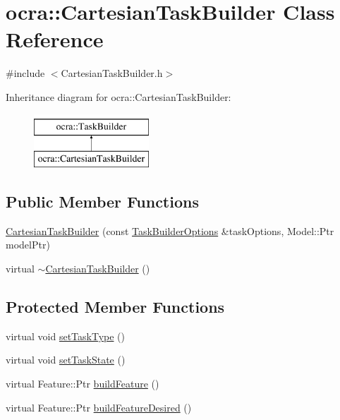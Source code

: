\hypertarget{classocra_1_1CartesianTaskBuilder}{}\section{ocra\+:\+:Cartesian\+Task\+Builder Class Reference}
\label{classocra_1_1CartesianTaskBuilder}


{\ttfamily \#include $<$Cartesian\+Task\+Builder.\+h$>$}

Inheritance diagram for ocra\+:\+:Cartesian\+Task\+Builder\+:\begin{figure}[H]
\begin{center}
\leavevmode
\includegraphics[height=2.000000cm]{d5/d81/classocra_1_1CartesianTaskBuilder}
\end{center}
\end{figure}
\subsection*{Public Member Functions}
\begin{DoxyCompactItemize}
\item 
\hyperlink{classocra_1_1CartesianTaskBuilder_ad78453b86c3777783c94098967426bad}{Cartesian\+Task\+Builder} (const \hyperlink{classocra_1_1TaskBuilderOptions}{Task\+Builder\+Options} \&task\+Options, Model\+::\+Ptr model\+Ptr)
\item 
virtual \hyperlink{classocra_1_1CartesianTaskBuilder_aecc30a79dfbeaf935d302a3f1e2c3fac}{$\sim$\+Cartesian\+Task\+Builder} ()
\end{DoxyCompactItemize}
\subsection*{Protected Member Functions}
\begin{DoxyCompactItemize}
\item 
virtual void \hyperlink{classocra_1_1CartesianTaskBuilder_a679842b95d6f7296a466636fd21bbbb8}{set\+Task\+Type} ()
\item 
virtual void \hyperlink{classocra_1_1CartesianTaskBuilder_a9e3175e5792c5ed9a7e3febbe458d21c}{set\+Task\+State} ()
\item 
virtual Feature\+::\+Ptr \hyperlink{classocra_1_1CartesianTaskBuilder_a58c8e4a299db03180c058eefcd711052}{build\+Feature} ()
\item 
virtual Feature\+::\+Ptr \hyperlink{classocra_1_1CartesianTaskBuilder_a308b204435c4063991d8101c0a8c512c}{build\+Feature\+Desired} ()
\end{DoxyCompactItemize}
